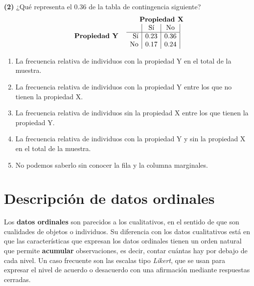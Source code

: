 \documentclass[
]{book}
\providecommand{\tightlist}{%
  \setlength{\itemsep}{0pt}\setlength{\parskip}{0pt}}
\theoremstyle{definition}
\theoremstyle{definition}
\theoremstyle{definition}
\theoremstyle{definition}
\theoremstyle{remark}
\begin{document}
\textbf{(2)} ¿Qué representa el 0.36 de la tabla de contingencia siguiente?
\[
\begin{array}{lc}
&\hphantom{YY}\textbf{Propiedad X} \\
\begin{array}{l}
\textbf{Propiedad Y}
\end{array}
&\!\!\!\!\!
\begin{array}{r |c|c|}
 &\text{Sí} & \text{No}  \\ \hline
  \text{Sí} & 0.23 & 0.36\\
  \text{No} & 0.17 & 0.24\\ 
\end{array}
\end{array}
\]

\begin{enumerate}
\def\labelenumi{\arabic{enumi}.}
\tightlist
\item
  La frecuencia relativa de individuos con la propiedad Y en el total de la muestra.
\item
  La frecuencia relativa de individuos con la propiedad Y entre los que no tienen la propiedad X.
\item
  La frecuencia relativa de individuos sin la propiedad X entre los que tienen la propiedad Y.
\item
  La frecuencia relativa de individuos con la propiedad Y y sin la propiedad X en el total de la muestra.
\item
  No podemos saberlo sin conocer la fila y la columna marginales.
\end{enumerate}

\hypertarget{descripciuxf3n-de-datos-ordinales}{%
\chapter{Descripción de datos ordinales}\label{descripciuxf3n-de-datos-ordinales}}

Los \textbf{datos ordinales} son parecidos a los cualitativos, en el sentido de que son cualidades de objetos o individuos. Su diferencia con los datos cualitativos está en que las características que expresan los datos ordinales tienen un orden natural que permite \textbf{acumular} observaciones, es decir, contar cuántas hay por debajo de cada nivel. Un caso frecuente son las escalas tipo \emph{Likert}, que se usan para expresar el nivel de acuerdo o desacuerdo con una afirmación mediante respuestas cerradas.
\end{document}
